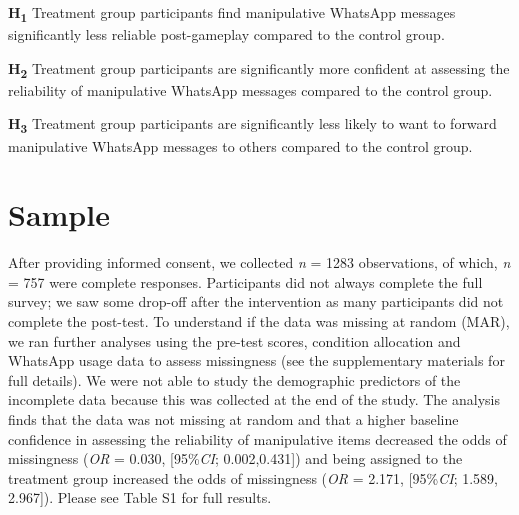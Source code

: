 \documentclass[empirical, authordate, issue]{jote-new-article}
\begin{document}
\textbf{H}\textsubscript{\textbf{1}} Treatment group participants find manipulative \mbox{WhatsApp} messages significantly less reliable post-gameplay compared to the control group.

\textbf{H}\textsubscript{\textbf{2}} Treatment group participants are significantly more confident at assessing the reliability of manipulative \mbox{WhatsApp} messages compared to the control group.

\textbf{H}\textsubscript{\textbf{3}} Treatment group participants are significantly less likely to want to forward manipulative \mbox{WhatsApp} messages to others compared to the control group.

\section{Sample }

After providing informed consent, we collected \emph{n} = 1283 observations, of which, \emph{n} = 757 were complete responses. Participants did not always complete the full survey; we saw some drop-off after the intervention as many participants did not complete the post-test. To understand if the data was missing at random (MAR), we ran further analyses using the pre-test scores, condition allocation and \mbox{WhatsApp} usage data to assess missingness (see the supplementary materials for full details). We were not able to study the demographic predictors of the incomplete data because this was collected at the end of the study. The analysis finds that the data was not missing at random and that a higher baseline confidence in assessing the reliability of manipulative items decreased the odds of missingness (\emph{OR} = 0.030, [95\%\emph{CI}; 0.002,0.431]) and being assigned to the treatment group increased the odds of missingness (\emph{OR} = 2.171, [95\%\emph{CI}; 1.589, 2.967]). Please see Table S1 for full results.
\end{document}
